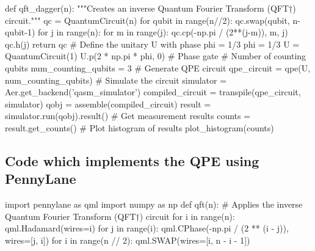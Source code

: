 \documentclass[%
oneside,                 %
final,                   %
10pt]{article}
\begin{document}
def qft_dagger(n):
   """Creates an inverse Quantum Fourier Transform (QFT†) circuit."""
   qc = QuantumCircuit(n)
   for qubit in range(n//2):
       qc.swap(qubit, n-qubit-1)
   for j in range(n):
       for m in range(j):
           qc.cp(-np.pi / (2**(j-m)), m, j)
       qc.h(j)
   return qc
# Define the unitary U with phase phi = 1/3
phi = 1/3
U = QuantumCircuit(1)
U.p(2 * np.pi * phi, 0)  # Phase gate
# Number of counting qubits
num_counting_qubits = 3
# Generate QPE circuit
qpe_circuit = qpe(U, num_counting_qubits)
# Simulate the circuit
simulator = Aer.get_backend('qasm_simulator')
compiled_circuit = transpile(qpe_circuit, simulator)
qobj = assemble(compiled_circuit)
result = simulator.run(qobj).result()
# Get measurement results
counts = result.get_counts()
# Plot histogram of results
plot_histogram(counts)

\epycode


\subsection{Code which implements the QPE using PennyLane}




















































\bpycode
import pennylane as qml
import numpy as np
def qft(n):
   # Applies the inverse Quantum Fourier Transform (QFT†) circuit
   for i in range(n):
       qml.Hadamard(wires=i)
       for j in range(i):
           qml.CPhase(-np.pi / (2 ** (i - j)), wires=[j, i])
   for i in range(n // 2):
       qml.SWAP(wires=[i, n - i - 1])
\end{document}
